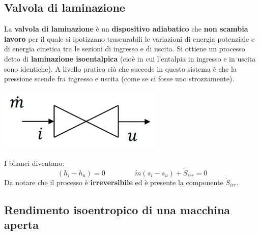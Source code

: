 \subsection{Valvola di laminazione}
La \textbf{valvola di laminazione} è un \textbf{dispositivo adiabatico} che \textbf{non scambia lavoro} per il quale si ipotizzano trascurabili le variazioni di energia potenziale e di energia cinetica tra le sezioni di ingresso e di uscita. Si ottiene un processo detto di \textbf{laminazione isoentalpica} (cioè in cui l'entalpia in ingresso e in uscita sono identiche).\newline
A livello pratico ciò che succede in questo sistema è che la pressione scende fra ingresso e uscita (come se ci fosse uno strozzamente).
\begin{center}
    \includegraphics[height=3cm]{../L06/img7.PNG}
\end{center}
I bilanci diventano:
\[
    (h_i-h_u) = 0 \;\;\;\;\;\;\;\;\;\;\;\;\;\;\;\dot{m}(s_i - s_u) + \dot{S}_{irr} = 0
\]
Da notare che il processo è \textbf{irreversibile} ed è presente la componente $\dot{S}_{irr}$.
\subsection{Rendimento isoentropico di una macchina aperta}
